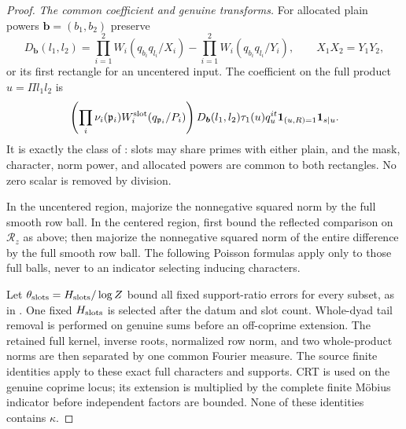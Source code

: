 \begin{proof}
\emph{The common coefficient and genuine transforms.}
For allocated plain powers $\boldsymbol b=(b_1,b_2)$ preserve
\[
 D_{\boldsymbol b}(l_1,l_2)=\prod_{i=1}^2W_i(q_{b_i}q_{l_i}/X_i)
                         -\prod_{i=1}^2W_i(q_{b_i}q_{l_i}/Y_i),
 \qquad X_1X_2=Y_1Y_2,
\]
or its first rectangle for an uncentered input. The coefficient on the full product $u=\Pi l_1l_2$ is
\[
 \left(\prod_i\nu_i(\mathfrak p_i)W_i^{\rm slot}(q_{\mathfrak p_i}/P_i)\right)
 D_{\boldsymbol b}(l_1,l_2)\tau_1(u)q_u^{it}
 \mathbf 1_{(u,R)=1}\mathbf 1_{s\mid u}.
\]
It is exactly the class of : slots may share primes with either plain, and the mask, character, norm power, and allocated powers are common to both rectangles. No zero scalar is removed by division.

In the uncentered region, majorize the nonnegative squared norm by
the full smooth row ball. In the centered region, first bound the
reflected comparison on $\mathcal R_z$ as above; then majorize the
nonnegative squared norm of the entire difference by the full smooth
row ball. The following Poisson formulas apply only to those full
balls, never to an indicator selecting inducing characters.

Let $\theta_{\rm slots}=H_{\rm slots}/\log Z$ bound all fixed support-ratio errors for every subset, as in . One fixed $H_{\rm slots}$ is selected after the datum and slot count. Whole-dyad tail removal is performed on genuine sums before an off-coprime extension. The retained full kernel, inverse roots, normalized row norm, and two whole-product norms are then separated by one common Fourier measure. The source finite identities  apply to these exact full characters and supports. CRT is used on the genuine coprime locus; its extension is multiplied by the complete finite Möbius indicator before independent factors are bounded. None of these identities contains $\kappa$.


\end{proof}
